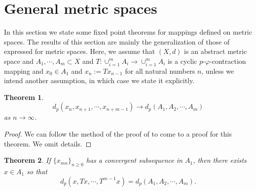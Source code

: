 \documentclass{amsart}
\newtheorem{theorem}{Theorem}[section]
\theoremstyle{definition}
\theoremstyle{remark}
\begin{document}
\section{General metric spaces}
In this section we state some fixed point theorems for mappings defined on metric spaces. The results of this section are mainly the generalization of those of \cite{ElVe} expressed for metric spaces. Here, we assume that $(X,d)$ is an abstract metric space and $A_1,\cdots,A_m\subset X$ and $T:\cup_{i=1}^mA_i\to\cup_{i=1}^mA_i$ is a cyclic $p$-$\varphi$-contraction mapping and $x_0\in A_1$ and $x_n:=Tx_{n-1}$ for all natural numbers $n$,
unless we intend another assumption, in which case we state it explicitly.
\begin{theorem}\label{XX}
 $$d_p(x_n, x_{n+1},\cdots,x_{n+m-1})\to d_p(A_1,A_2,\cdots,A_m)$$ as $n\to\infty$.
\end{theorem}
\begin{proof}We can follow the method of the proof of \cite[Theorem 3]{ThSh} to come to a proof for this theorem. We omit details.
\end{proof}
\begin{theorem}\label{SS1}
 If $\{x_{mn}\}_{n\geq0}$ has a convergent subsequence in $A_1$, then there exists $x\in A_1$ so that $$d_p(x,Tx,\cdots,T^{m-1}x)=d_p(A_1,A_2,\cdots,A_m).$$
\end{theorem}
\end{document}
